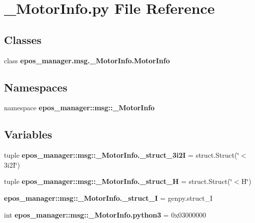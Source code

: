 \section{\-\_\-\-Motor\-Info.\-py \-File \-Reference}
\label{__MotorInfo_8py}
\subsection*{\-Classes}
\begin{DoxyCompactItemize}
\item 
class {\bf epos\-\_\-manager.\-msg.\-\_\-\-Motor\-Info.\-Motor\-Info}
\end{DoxyCompactItemize}
\subsection*{\-Namespaces}
\begin{DoxyCompactItemize}
\item 
namespace {\bf epos\-\_\-manager\-::msg\-::\-\_\-\-Motor\-Info}
\end{DoxyCompactItemize}
\subsection*{\-Variables}
\begin{DoxyCompactItemize}
\item 
tuple {\bf epos\-\_\-manager\-::msg\-::\-\_\-\-Motor\-Info.\-\_\-struct\-\_\-3i2\-I} = struct.\-Struct(\char`\"{}$<$3i2\-I\char`\"{})
\item 
tuple {\bf epos\-\_\-manager\-::msg\-::\-\_\-\-Motor\-Info.\-\_\-struct\-\_\-\-H} = struct.\-Struct(\char`\"{}$<$\-H\char`\"{})
\item 
{\bf epos\-\_\-manager\-::msg\-::\-\_\-\-Motor\-Info.\-\_\-struct\-\_\-\-I} = genpy.\-struct\-\_\-\-I
\item 
int {\bf epos\-\_\-manager\-::msg\-::\-\_\-\-Motor\-Info.\-python3} = 0x03000000
\end{DoxyCompactItemize}
